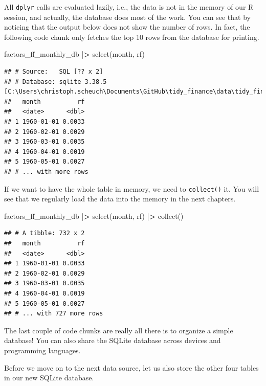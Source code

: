 \documentclass[
]{book}
\newenvironment{Shaded}{\begin{snugshade}}{\end{snugshade}}
\newcommand{\ErrorTok}[1]{\textcolor[rgb]{0.14,0.14,0.14}{\textbf{#1}}}
\newcommand{\FunctionTok}[1]{\textcolor[rgb]{0,0,0}{#1}}
\newcommand{\NormalTok}[1]{#1}
\newcommand{\SpecialCharTok}[1]{\textcolor[rgb]{0,0,0}{#1}}
\begin{document}
All \texttt{dplyr} calls are evaluated lazily, i.e., the data is not in the memory of our R session, and actually, the database does most of the work. You can see that by noticing that the output below does not show the number of rows. In fact, the following code chunk only fetches the top 10 rows from the database for printing.

\begin{Shaded}
\begin{Highlighting}[]
\NormalTok{factors\_ff\_monthly\_db }\SpecialCharTok{|}\ErrorTok{\textgreater{}}
  \FunctionTok{select}\NormalTok{(month, rf)}
\end{Highlighting}
\end{Shaded}

\begin{verbatim}
## # Source:   SQL [?? x 2]
## # Database: sqlite 3.38.5 [C:\Users\christoph.scheuch\Documents\GitHub\tidy_finance\data\tidy_finance.sqlite]
##   month          rf
##   <date>      <dbl>
## 1 1960-01-01 0.0033
## 2 1960-02-01 0.0029
## 3 1960-03-01 0.0035
## 4 1960-04-01 0.0019
## 5 1960-05-01 0.0027
## # ... with more rows
\end{verbatim}

If we want to have the whole table in memory, we need to \texttt{collect()} it. You will see that we regularly load the data into the memory in the next chapters.

\begin{Shaded}
\begin{Highlighting}[]
\NormalTok{factors\_ff\_monthly\_db }\SpecialCharTok{|}\ErrorTok{\textgreater{}}
  \FunctionTok{select}\NormalTok{(month, rf) }\SpecialCharTok{|}\ErrorTok{\textgreater{}}
  \FunctionTok{collect}\NormalTok{()}
\end{Highlighting}
\end{Shaded}

\begin{verbatim}
## # A tibble: 732 x 2
##   month          rf
##   <date>      <dbl>
## 1 1960-01-01 0.0033
## 2 1960-02-01 0.0029
## 3 1960-03-01 0.0035
## 4 1960-04-01 0.0019
## 5 1960-05-01 0.0027
## # ... with 727 more rows
\end{verbatim}

The last couple of code chunks are really all there is to organize a simple database! You can also share the SQLite database across devices and programming languages.

Before we move on to the next data source, let us also store the other four tables in our new SQLite database.
\end{document}
